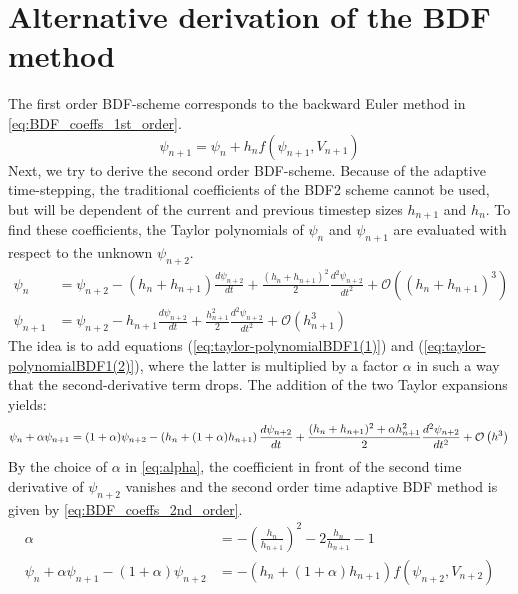 \section{Alternative derivation of the BDF method}
\label{apx:BDF_derivation_Taylor}
The first order BDF-scheme corresponds to the backward Euler method in \autoref{eq:BDF_coeffs_1st_order}.
\begin{equation}
\label{eq:BDF_coeffs_1st_order}
\psi_{n+1} = \psi_n + h_{n}f(\psi_{n+1},V_{n+1})
\end{equation}
Next, we try to derive the second order BDF-scheme. Because of the adaptive time-stepping, the traditional coefficients of the BDF2 scheme cannot be used, but will be dependent of the current and previous timestep sizes $h_{n+1}$ and $h_n$. To find these coefficients, the Taylor polynomials of $\psi_n$ and $\psi_{n+1}$ are evaluated with respect to the unknown $\psi_{n+2}$. 
\begin{align}
\label{eq:taylor-polynomialBDF1(1)}
\psi_{n} &= \psi_{n+2} - (h_{n} + h_{n+1})\frac{d\psi_{n+2}}{dt} + \frac{(h_{n} + h_{n+1})^2}{2}\frac{d^2\psi_{n+2}}{dt^2} + \mathcal{O}\left((h_{n} + h_{n+1})^3\right) \\
\label{eq:taylor-polynomialBDF1(2)}
\psi_{n+1} &= \psi_{n+2} - h_{n+1}\frac{d\psi_{n+2}}{dt} + \frac{h_{n+1}^2}{2}\frac{d^2\psi_{n+2}}{dt^2} + \mathcal{O}\left(h_{n+1}^3\right)
\end{align}
The idea is to add equations (\ref{eq:taylor-polynomialBDF1(1)}) and (\ref{eq:taylor-polynomialBDF1(2)}), where the latter is multiplied by a factor $\alpha$ in such a way that the second-derivative term drops. The addition of the two Taylor expansions yields: 
\begin{equation}
\psi_{n} + \alpha \psi_{n+1} = (1+\alpha)\psi_{n+2} - \left(h_{n} + (1+\alpha)h_{n+1}\right)\frac{d\psi_{n+2}}{dt} + \frac{(h_{n} + h_{n+1})^2+\alpha h_{n+1}^2}{2}\frac{d^2\psi_{n+2}}{dt^2} + \mathcal{O}\left(h^3\right) \\
\end{equation}
By the choice of $\alpha$ in \autoref{eq:alpha}, the coefficient in front of the second time derivative of $\psi_{n+2}$ vanishes and the second order time adaptive BDF method is given by \autoref{eq:BDF_coeffs_2nd_order}. 
\begin{align}
\label{eq:alpha}
\alpha &= -\left(\frac{h_n}{h_{n+1}}\right)^2 - 2\frac{h_n}{h_{n+1}} - 1 \\
\label{eq:BDF_coeffs_2nd_order}
\psi_n + \alpha \psi_{n+1} -(1+\alpha)\psi_{n+2} &= -\left(h_n + (1+\alpha)h_{n+1}\right)f(\psi_{n+2}, V_{n+2})
\end{align}
